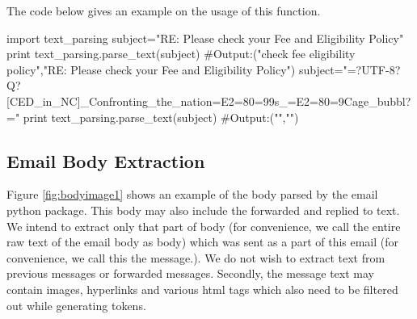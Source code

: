 \documentclass[fleqn]{MJDArticle}
\begin{document}
\par
The code below gives an example on the usage of this function. 
\begin{code}
import text_parsing
subject="RE: Please check your Fee and Eligibility Policy"
print text_parsing.parse_text(subject)
#Output:("check fee eligibility policy","RE: Please check your Fee and Eligibility Policy")
subject="=?UTF-8?Q?[CED_in_NC]_Confronting_the_nation=E2=80=99s_=E2=80=9Cage_bubbl?="
print text_parsing.parse_text(subject)
#Output:("","")
\end{code}
\subsection{Email Body Extraction}
Figure \ref{fig:bodyimage1} shows an  example of the body parsed by the email python package. This body may also include the forwarded and replied to text. We intend to extract only that part of body (for convenience, we call the entire raw text of the email body as body) which was sent as a part of this email (for convenience, we call this the message.). We do not wish to extract text from previous messages or forwarded messages.  Secondly, the message text may contain images, hyperlinks and various html tags which also need to be filtered out while generating tokens. 
\end{document}
